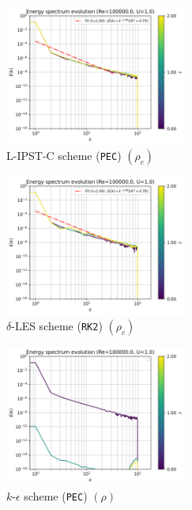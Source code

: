 \begin{figure}[htbp!]
  \begin{subfigure}{7cm}
  \centering\includegraphics[width=6cm]{Code-Figures/long-tgv/c0_20_tait_hdx_2_pec_dtmul_1_sd_n_o_files_50_nx_200_pst_10_re_100000_tsph_wcsph_tf_2/energy_spectrum_evolution_all.png}
  \caption{L-IPST-C scheme (\texttt{PEC}) $(\rho_c)$}
  \end{subfigure}
  \begin{subfigure}{7cm}
  \centering\includegraphics[width=6cm]{Code-Figures/long-tgv/c0_20_tait_hdx_2_rk2_dtmul_1.5_n_o_files_50_nx_200_pst_10_re_100000_deltales_tf_2/energy_spectrum_evolution_all.png}
  \caption{$\delta$-LES scheme (\texttt{RK2}) $(\rho_c)$}
  \end{subfigure}
  \begin{subfigure}{7cm}
  \centering\includegraphics[width=6cm]{Code-Figures/long-tgv/c0_20_tait_hdx_2_pec_dtmul_1_no_n_o_files_50_nx_200_pst_10_re_100000_k_eps_tf_2/energy_spectrum_evolution_all.png}
  \caption{$k$-$\epsilon$ scheme (\texttt{PEC}) $(\rho)$}
  \end{subfigure}
  \begin{subfigure}{7cm}

\end{subfigure}
\end{figure}
